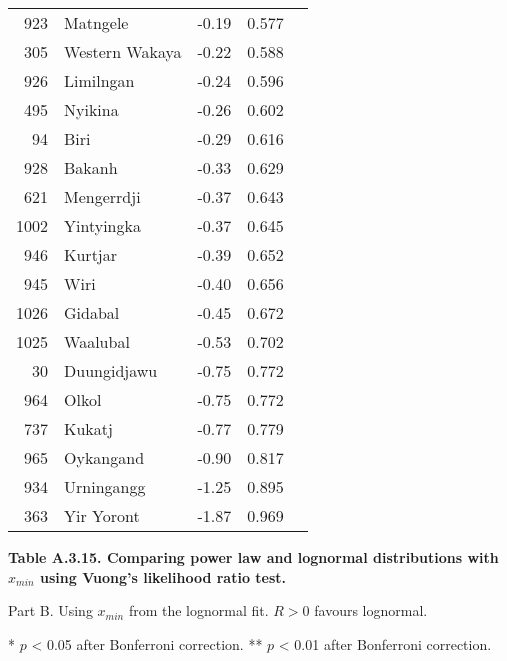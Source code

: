 \begin{longtable}[]{@{}rlrrl@{}}
923 & Matngele & -0.19 & 0.577 &\tabularnewline
305 & Western Wakaya & -0.22 & 0.588 &\tabularnewline
926 & Limilngan & -0.24 & 0.596 &\tabularnewline
495 & Nyikina & -0.26 & 0.602 &\tabularnewline
94 & Biri & -0.29 & 0.616 &\tabularnewline
928 & Bakanh & -0.33 & 0.629 &\tabularnewline
621 & Mengerrdji & -0.37 & 0.643 &\tabularnewline
1002 & Yintyingka & -0.37 & 0.645 &\tabularnewline
946 & Kurtjar & -0.39 & 0.652 &\tabularnewline
945 & Wiri & -0.40 & 0.656 &\tabularnewline
1026 & Gidabal & -0.45 & 0.672 &\tabularnewline
1025 & Waalubal & -0.53 & 0.702 &\tabularnewline
30 & Duungidjawu & -0.75 & 0.772 &\tabularnewline
964 & Olkol & -0.75 & 0.772 &\tabularnewline
737 & Kukatj & -0.77 & 0.779 &\tabularnewline
965 & Oykangand & -0.90 & 0.817 &\tabularnewline
934 & Urningangg & -1.25 & 0.895 &\tabularnewline
363 & Yir Yoront & -1.87 & 0.969 &\tabularnewline
\bottomrule
\end{longtable}

\newpage

\textbf{Table A.3.15. Comparing power law and lognormal distributions
with \(x_{min}\) using Vuong's likelihood ratio test.}

Part B. Using \(x_{min}\) from the lognormal fit. \(R > 0\) favours
lognormal.

* \(p\) \textless{} 0.05 after Bonferroni correction. ** \(p\)
\textless{} 0.01 after Bonferroni correction.

